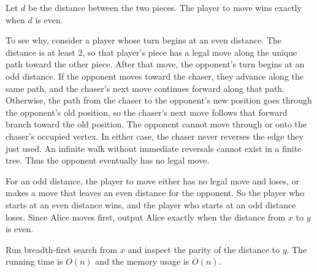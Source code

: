 Let $d$ be the distance between the two pieces. The player to move wins exactly when $d$ is even.

To see why, consider a player whose turn begins at an even distance. The distance is at least $2$, so that player's piece has a legal move along the unique path toward the other piece. After that move, the opponent's turn begins at an odd distance. If the opponent moves toward the chaser, they advance along the same path, and the chaser's next move continues forward along that path. Otherwise, the path from the chaser to the opponent's new position goes through the opponent's old position, so the chaser's next move follows that forward branch toward the old position. The opponent cannot move through or onto the chaser's occupied vertex. In either case, the chaser never reverses the edge they just used. An infinite walk without immediate reversals cannot exist in a finite tree. Thus the opponent eventually has no legal move.

For an odd distance, the player to move either has no legal move and loses, or makes a move that leaves an even distance for the opponent. So the player who starts at an even distance wins, and the player who starts at an odd distance loses. Since Alice moves first, output Alice exactly when the distance from $x$ to $y$ is even.

Run breadth-first search from $x$ and inspect the parity of the distance to $y$. The running time is $O(n)$ and the memory usage is $O(n)$.
